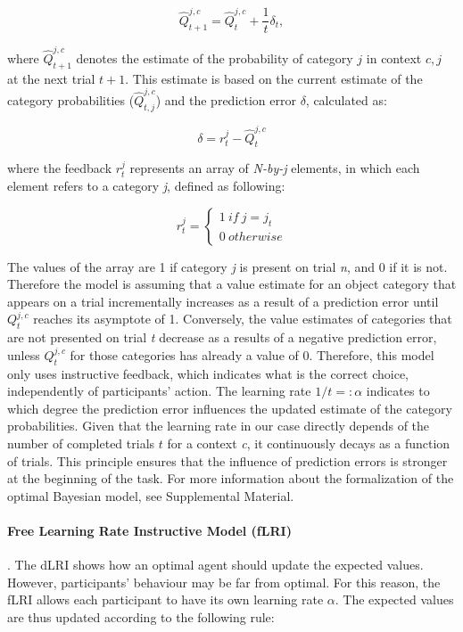 \documentclass[a4paper,12pt]{article} 			%
\begin{document}
\begin{equation}
\hat{Q}_{t+1}^{j,c} = \hat{Q}_{t}^{j,c}  + \dfrac{1}{t} \delta_{t},
\end{equation}


\noindent
where $\hat{Q}_{t+1}^{j,c}$ denotes the estimate of the probability of category $j$ in context ${c,j}$ at the next trial $t+1$. This estimate is based on the current estimate of the category probabilities ($\hat{Q}_{t,j}^{j, c}$) and the prediction error $\delta$, calculated as:

\begin{equation}
{\delta} = {r}_t^{j} - \hat{Q}_{t}^{j,c}
\label{eq:PE}
\end{equation}

\noindent
where the feedback ${r}_t^{j}$ represents an array of \textit{N-by-j} elements, in which each element refers to a category \textit{j}, defined as following:

\begin{equation}
r_t^j = \begin{cases}
1\ if  \ j = j_t  \\ 
0 \ otherwise
\end{cases}
\label{eq:instrPE}
\end{equation}

\noindent
 The values of the array are 1 if category \textit{j} is present on trial \textit{n}, and 0 if it is not. Therefore the model is assuming that a value estimate for an object category that appears on a trial incrementally increases as a result of a prediction error until $Q_{t}^{j,c}$ reaches its asymptote of 1. Conversely, the value estimates of categories that are not presented on trial \textit{t} decrease as a results of a negative prediction error, unless $Q_{t}^{j,c}$ for those categories has already a value of 0. 
Therefore, this model only uses instructive feedback, which indicates what is the correct choice, independently of participants' action. The learning rate $1/t =: \alpha$ indicates to which degree the prediction error influences the updated estimate of the category probabilities. Given that the learning rate in our case directly depends of the number of completed trials $t$ for a context \textit{c}, it continuously decays as a function of trials. This principle ensures that the influence of prediction errors is stronger at the beginning of the task. For more information about the formalization of the optimal Bayesian model, see Supplemental Material. 

\paragraph{Free Learning Rate Instructive Model (fLRI)}. The dLRI shows how an optimal agent should update the expected values. However, participants' behaviour may be far from optimal. %
For this reason, the fLRI allows each participant to have its own learning rate $\alpha$. The expected values are thus updated according to the following rule: 
\end{document}
